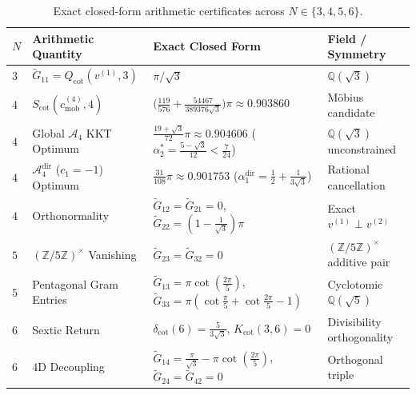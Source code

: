 \documentclass[11pt,a4paper]{article}
\theoremstyle{definition}
\newcommand{\Z}{\mathbb{Z}}
\newcommand{\Q}{\mathbb{Q}}
\begin{document}
\begin{table}[ht]
\centering
\caption{Exact closed-form arithmetic certificates across $N \in \{3, 4, 5, 6\}$.}
\label{tab:exact_certs}
\vspace{4pt}
\footnotesize
\setlength{\tabcolsep}{4.5pt}
\renewcommand{\arraystretch}{1.18}
\begin{tabular}{@{}llll@{}}
\toprule
$N$ & Arithmetic Quantity & Exact Closed Form & Field / Symmetry \\
\midrule
$3$ & $\widetilde{G}_{11} = Q_{\mathrm{cot}}(v^{(1)}, 3)$ & $\pi / \sqrt{3}$ & $\Q(\sqrt{3})$ \\
$4$ & $S_{\mathrm{cot}}(c_{\mathrm{mob}}^{(4)}, 4)$ & $\bigl(\tfrac{119}{576} + \tfrac{54467}{389376\sqrt{3}}\bigr)\pi \approx 0.903860$ & M\"obius candidate \\
$4$ & Global $\mathcal{A}_4$ KKT Optimum & $\tfrac{19+\sqrt{3}}{72}\pi \approx 0.904606$ ($\alpha_2^* = \tfrac{5-\sqrt{3}}{12} < \tfrac{7}{24}$) & $\Q(\sqrt{3})$ unconstrained \\
$4$ & $\mathcal{A}_4^{\mathrm{dir}}$ ($c_1=-1$) Optimum & $\tfrac{31}{108}\pi \approx 0.901753$ ($\alpha_1^{\mathrm{dir}} = \tfrac{1}{2} + \tfrac{1}{3\sqrt{3}}$) & Rational cancellation \\
$4$ & Orthonormality & $\widetilde{G}_{12} = \widetilde{G}_{21} = 0$, \; $\widetilde{G}_{22} = (1 - \tfrac{1}{\sqrt{3}})\pi$ & Exact $v^{(1)} \perp v^{(2)}$ \\
$5$ & $(\Z/5\Z)^\times$ Vanishing & $\widetilde{G}_{23} = \widetilde{G}_{32} = 0$ & $(\Z/5\Z)^\times$ additive pair \\
$5$ & Pentagonal Gram Entries & $\widetilde{G}_{13} = \pi\cot(\tfrac{2\pi}{5})$, \; $\widetilde{G}_{33} = \pi(\cot\tfrac{\pi}{5} + \cot\tfrac{2\pi}{5} - 1)$ & Cyclotomic $\Q(\sqrt{5})$ \\
$6$ & Sextic Return & $\delta_{\mathrm{cot}}(6) = \tfrac{5}{3\sqrt{3}}$, \; $K_{\mathrm{cot}}(3, 6) = 0$ & Divisibility orthogonality \\
$6$ & 4D Decoupling & $\widetilde{G}_{14} = \tfrac{\pi}{\sqrt{3}} - \pi\cot(\tfrac{2\pi}{5})$, \; $\widetilde{G}_{24} = \widetilde{G}_{42} = 0$ & Orthogonal triple \\
\bottomrule
\end{tabular}
\end{table}
\end{document}
